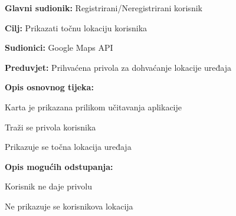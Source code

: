 					\noindent {}
					\begin{packed_item}
	
						\item \textbf{Glavni sudionik: }Registrirani/Neregistrirani korisnik
						\item  \textbf{Cilj:} Prikazati točnu lokaciju korisnika
						\item  \textbf{Sudionici:} Google Maps API
						\item  \textbf{Preduvjet:} Prihvaćena privola za dohvaćanje lokacije uređaja
						\item  \textbf{Opis osnovnog tijeka:}
						
						\item[] \begin{packed_enum}
	
							\item Karta je prikazana prilikom učitavanja aplikacije
							\item Traži se privola korisnika
							\item Prikazuje se točna lokacija uređaja

						\end{packed_enum}
						
						\item  \textbf{Opis mogućih odstupanja:}
						
						\item[] \begin{packed_item}
	
							\item[2.a] Korisnik ne daje privolu
							\item[] \begin{packed_enum}
								
								\item Ne prikazuje se korisnikova lokacija
								
							\end{packed_enum}
							
						\end{packed_item}
						
					\end{packed_item}
					
